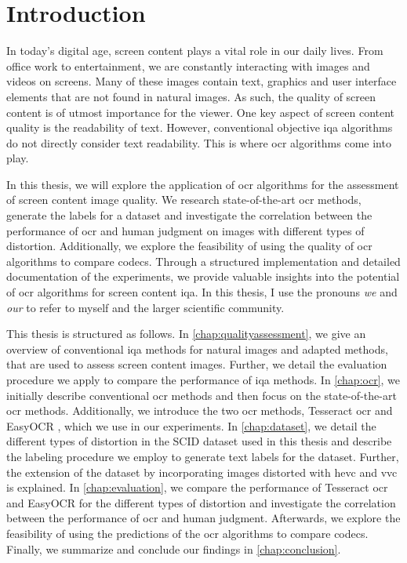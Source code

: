 \chapter{Introduction}
\label{chap:Introduction}


In today’s digital age, screen content plays a vital role in our daily lives.
From office work to entertainment, we are constantly interacting with images and videos on screens.
Many of these images contain text, graphics and user interface elements that are not found in natural images.
As such, the quality of screen content is of utmost importance for the viewer.
One key aspect of screen content quality is the readability of text.
However, conventional objective \gls{iqa} algorithms do not directly consider text readability.
This is where \gls{ocr} algorithms come into play.

In this thesis, we will explore the application of \gls{ocr} algorithms for the assessment of screen content image quality.
We research state-of-the-art \gls{ocr} methods, generate the labels for a dataset and investigate the correlation between the performance of \gls{ocr} and human judgment on images with different types of distortion.
Additionally, we explore the feasibility of using the quality of \gls{ocr} algorithms to compare codecs.
Through a structured implementation and detailed documentation of the experiments, we provide valuable insights into the potential of \gls{ocr} algorithms for screen content \gls{iqa}.
In this thesis, I use the pronouns \textit{we} and \textit{our} to refer to myself and the larger scientific community.

This thesis is structured as follows.
In \autoref{chap:qualityassessment}, we give an overview of conventional \gls{iqa} methods for natural images and adapted methods, that are used to assess screen content images.
Further, we detail the evaluation procedure we apply to compare the performance of \gls{iqa} methods.
In \autoref{chap:ocr}, we initially describe conventional \gls{ocr} methods and then focus on the state-of-the-art \gls{ocr} methods.
Additionally, we introduce the two \gls{ocr} methods, Tesseract \gls{ocr} \cite{tesseract_legacy_2007} and EasyOCR \cite{easyocr_gitub_2020}, which we use in our experiments.
In \autoref{chap:dataset}, we detail the different types of distortion in the SCID dataset \cite{ni_esim_2017} used in this thesis and describe the labeling procedure we employ to generate text labels for the dataset.
Further, the extension of the dataset by incorporating images distorted with \gls{hevc} \cite{hevc_2012} and \gls{vvc} \cite{vvc_2021} is explained.
In \autoref{chap:evaluation}, we compare the performance of Tesseract \gls{ocr} and EasyOCR for the different types of distortion and investigate the correlation between the performance of \gls{ocr} and human judgment.
Afterwards, we explore the feasibility of using the predictions of the \gls{ocr} algorithms to compare codecs.
Finally, we summarize and conclude our findings in \autoref{chap:conclusion}.
